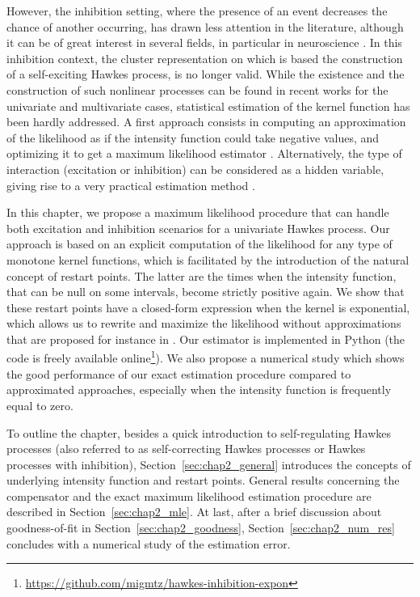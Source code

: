 However, the inhibition setting, where the presence of an event decreases the chance of another occurring, has drawn less attention in the literature, although it can be of great interest in several fields, in particular in neuroscience \parencite{Lambert2018}. In this inhibition context, the cluster representation \parencite{Hawkes1974} on which is based the construction of a self-exciting Hawkes process, is no longer valid.
While the existence and the construction of such nonlinear processes can be found in recent works for the univariate \parencite{Costa2020} and multivariate \parencite{Chen2017} cases,
statistical estimation of the kernel function has been hardly addressed.
A first approach consists in computing an approximation of the likelihood as if the intensity function could take negative values, and optimizing it to get a maximum likelihood estimator \parencite{Lemonnier2014}.
Alternatively, the type of interaction (excitation or inhibition) can be considered as a hidden variable, giving rise to a very practical estimation method \parencite{Mei2017}.

In this chapter, we propose a maximum likelihood procedure that can handle both excitation and inhibition scenarios for a univariate Hawkes process. Our approach is based on an explicit computation of the likelihood for any type of monotone kernel functions, which is facilitated by the introduction of the natural concept of restart points. The latter are the times when the intensity function, that can be null on some intervals, become strictly positive again. We show that these restart points have a closed-form expression when the kernel is exponential, which allows us to rewrite and maximize the likelihood without approximations that are proposed for instance in \textcite{Lemonnier2014}.  Our estimator is implemented in Python (the code is freely available online\footnote{\url{https://github.com/migmtz/hawkes-inhibition-expon}}). We also propose a numerical study which shows the good performance of our exact estimation procedure compared to approximated approaches, especially when the intensity function is frequently equal to zero.

To outline the chapter, besides a quick introduction to self-regulating Hawkes processes (also referred to as self-correcting Hawkes processes or Hawkes processes with inhibition), Section~\ref{sec:chap2_general} introduces the concepts of underlying intensity function and restart points.
General results concerning the compensator and the exact maximum likelihood estimation procedure are described in Section~\ref{sec:chap2_mle}.
At last, after a brief discussion about goodness-of-fit in Section~\ref{sec:chap2_goodness},
Section~\ref{sec:chap2_num_res} concludes with a numerical study of the estimation error.

